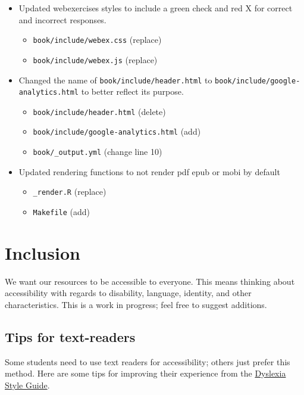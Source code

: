 \documentclass[
  oneside]{book}
\providecommand{\tightlist}{%
  \setlength{\itemsep}{0pt}\setlength{\parskip}{0pt}}
\begin{document}
\begin{itemize}
\tightlist
\item
  Updated webexercises styles to include a green check and red X for correct and incorrect responses.

  \begin{itemize}
  \tightlist
  \item
    \texttt{book/include/webex.css} (replace)
  \item
    \texttt{book/include/webex.js} (replace)
  \end{itemize}
\item
  Changed the name of \texttt{book/include/header.html} to \texttt{book/include/google-analytics.html} to better reflect its purpose.

  \begin{itemize}
  \tightlist
  \item
    \texttt{book/include/header.html} (delete)
  \item
    \texttt{book/include/google-analytics.html} (add)
  \item
    \texttt{book/\_output.yml} (change line 10)
  \end{itemize}
\item
  Updated rendering functions to not render pdf epub or mobi by default

  \begin{itemize}
  \tightlist
  \item
    \texttt{\_render.R} (replace)
  \item
    \texttt{Makefile} (add)
  \end{itemize}
\end{itemize}

\hypertarget{inclusion}{%
\chapter{Inclusion}\label{inclusion}}

We want our resources to be accessible to everyone. This means thinking about accessibility with regards to disability, language, identity, and other characteristics. This is a work in progress; feel free to suggest additions.

\hypertarget{tips-for-text-readers}{%
\section{Tips for text-readers}\label{tips-for-text-readers}}

Some students need to use text readers for accessibility; others just prefer this method. Here are some tips for improving their experience from the \href{https://www.bdadyslexia.org.uk/advice/employers/creating-a-dyslexia-friendly-workplace/dyslexia-friendly-style-guide}{Dyslexia Style Guide}.
\end{document}
